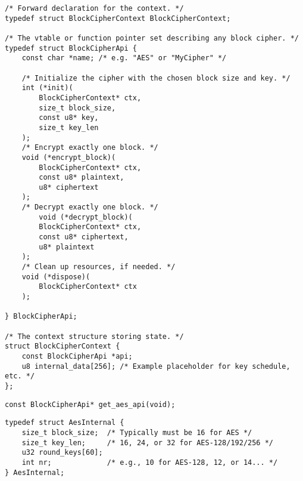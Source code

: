 \begin{lstlisting}[style=cstyle, caption={include/block\_cipher/block\_cipher.h}, captionpos=t]
/* Forward declaration for the context. */
typedef struct BlockCipherContext BlockCipherContext;

/* The vtable or function pointer set describing any block cipher. */
typedef struct BlockCipherApi {
	const char *name; /* e.g. "AES" or "MyCipher" */
	
	/* Initialize the cipher with the chosen block size and key. */
	int (*init)(
		BlockCipherContext* ctx,
		size_t block_size,
		const u8* key,
		size_t key_len
	);
	/* Encrypt exactly one block. */
	void (*encrypt_block)(
		BlockCipherContext* ctx,
		const u8* plaintext,
		u8* ciphertext
	);
	/* Decrypt exactly one block. */
		void (*decrypt_block)(
		BlockCipherContext* ctx,
		const u8* ciphertext,
		u8* plaintext
	);
	/* Clean up resources, if needed. */
	void (*dispose)(
		BlockCipherContext* ctx
	);
	
} BlockCipherApi;

/* The context structure storing state. */
struct BlockCipherContext {
	const BlockCipherApi *api;  
	u8 internal_data[256]; /* Example placeholder for key schedule, etc. */
};
\end{lstlisting}
\begin{lstlisting}[style=cstyle, caption={include/block\_cipher/block\_cipher\_aes.h}, captionpos=t]
const BlockCipherApi* get_aes_api(void);
\end{lstlisting}
\begin{lstlisting}[style=cstyle, caption={src/block\_cipher/block\_cipher\_aes.c}, captionpos=t]
typedef struct AesInternal {
	size_t block_size;  /* Typically must be 16 for AES */
	size_t key_len;     /* 16, 24, or 32 for AES-128/192/256 */
	u32 round_keys[60]; 
	int nr;             /* e.g., 10 for AES-128, 12, or 14... */
} AesInternal;
\end{lstlisting}

